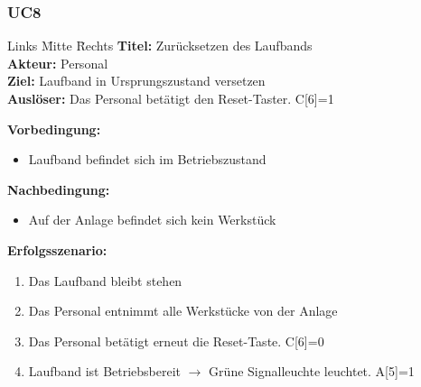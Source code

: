 \documentclass[oneside,a4paper,titlepage]{scrartcl} %
\begin{document}
\newpage

\subsubsection{UC8}
\begin{tabbing}
 Links \= Mitte \= Rechts \kill
 \textbf{Titel:} \> \> Zurücksetzen des Laufbands\\
 \textbf{Akteur:} \> \> Personal\\
 \textbf{Ziel:} \> \> Laufband in Ursprungszustand versetzen\\
 \textbf{Auslöser:} \> \> Das Personal betätigt den Reset-Taster. C[6]=1\\
\end{tabbing}
\textbf{Vorbedingung:}
\begin{itemize}
 \item Laufband befindet sich im Betriebszustand
\end{itemize}
\textbf{Nachbedingung:}
\begin{itemize}
 \item Auf der Anlage befindet sich kein Werkstück
\end{itemize}
\textbf{Erfolgsszenario:}
\begin{enumerate}
 \item Das Laufband bleibt stehen
 \item Das Personal entnimmt alle Werkstücke von der Anlage
 \item Das Personal betätigt erneut die Reset-Taste. C[6]=0
 \item Laufband ist Betriebsbereit $\rightarrow$ Grüne Signalleuchte leuchtet. A[5]=1
\end{enumerate}
\end{document}
